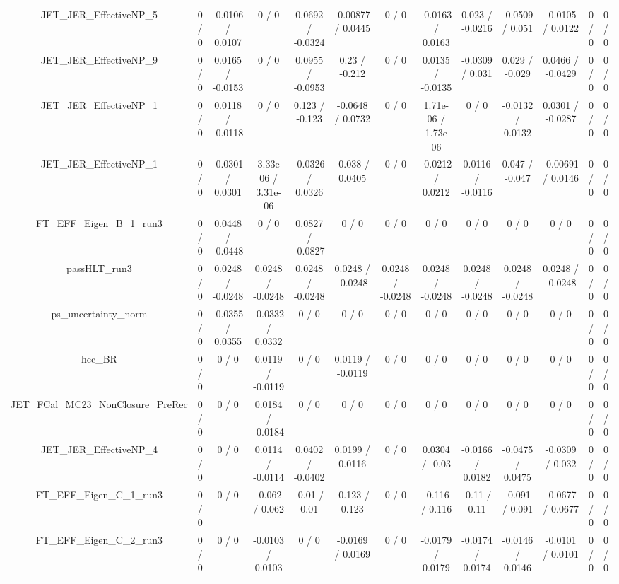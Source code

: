\documentclass[10pt]{article}
\begin{document}
\begin{table}[htbp]
\begin{center}
\begin{tabular}{|c|c|c|c|c|c|c|c|c|c|c|c|c|}
  JET_JER_EffectiveNP_5 & 0 / 0 & -0.0106 / 0.0107 & 0 / 0 & 0.0692 / -0.0324 & -0.00877 / 0.0445 & 0 / 0 & -0.0163 / 0.0163 & 0.023 / -0.0216 & -0.0509 / 0.051 & -0.0105 / 0.0122 & 0 / 0 & 0 / 0 \\ 
  JET_JER_EffectiveNP_9 & 0 / 0 & 0.0165 / -0.0153 & 0 / 0 & 0.0955 / -0.0953 & 0.23 / -0.212 & 0 / 0 & 0.0135 / -0.0135 & -0.0309 / 0.031 & 0.029 / -0.029 & 0.0466 / -0.0429 & 0 / 0 & 0 / 0 \\ 
  JET_JER_EffectiveNP_1 & 0 / 0 & 0.0118 / -0.0118 & 0 / 0 & 0.123 / -0.123 & -0.0648 / 0.0732 & 0 / 0 & 1.71e-06 / -1.73e-06 & 0 / 0 & -0.0132 / 0.0132 & 0.0301 / -0.0287 & 0 / 0 & 0 / 0 \\ 
  JET_JER_EffectiveNP_1 & 0 / 0 & -0.0301 / 0.0301 & -3.33e-06 / 3.31e-06 & -0.0326 / 0.0326 & -0.038 / 0.0405 & 0 / 0 & -0.0212 / 0.0212 & 0.0116 / -0.0116 & 0.047 / -0.047 & -0.00691 / 0.0146 & 0 / 0 & 0 / 0 \\ 
  FT_EFF_Eigen_B_1_run3 & 0 / 0 & 0.0448 / -0.0448 & 0 / 0 & 0.0827 / -0.0827 & 0 / 0 & 0 / 0 & 0 / 0 & 0 / 0 & 0 / 0 & 0 / 0 & 0 / 0 & 0 / 0 \\ 
  passHLT_run3 & 0 / 0 & 0.0248 / -0.0248 & 0.0248 / -0.0248 & 0.0248 / -0.0248 & 0.0248 / -0.0248 & 0.0248 / -0.0248 & 0.0248 / -0.0248 & 0.0248 / -0.0248 & 0.0248 / -0.0248 & 0.0248 / -0.0248 & 0 / 0 & 0 / 0 \\ 
  ps_uncertainty_norm & 0 / 0 & -0.0355 / 0.0355 & -0.0332 / 0.0332 & 0 / 0 & 0 / 0 & 0 / 0 & 0 / 0 & 0 / 0 & 0 / 0 & 0 / 0 & 0 / 0 & 0 / 0 \\ 
  hcc_BR & 0 / 0 & 0 / 0 & 0.0119 / -0.0119 & 0 / 0 & 0.0119 / -0.0119 & 0 / 0 & 0 / 0 & 0 / 0 & 0 / 0 & 0 / 0 & 0 / 0 & 0 / 0 \\ 
  JET_FCal_MC23_NonClosure_PreRec & 0 / 0 & 0 / 0 & 0.0184 / -0.0184 & 0 / 0 & 0 / 0 & 0 / 0 & 0 / 0 & 0 / 0 & 0 / 0 & 0 / 0 & 0 / 0 & 0 / 0 \\ 
  JET_JER_EffectiveNP_4 & 0 / 0 & 0 / 0 & 0.0114 / -0.0114 & 0.0402 / -0.0402 & 0.0199 / 0.0116 & 0 / 0 & 0.0304 / -0.03 & -0.0166 / 0.0182 & -0.0475 / 0.0475 & -0.0309 / 0.032 & 0 / 0 & 0 / 0 \\ 
  FT_EFF_Eigen_C_1_run3 & 0 / 0 & 0 / 0 & -0.062 / 0.062 & -0.01 / 0.01 & -0.123 / 0.123 & 0 / 0 & -0.116 / 0.116 & -0.11 / 0.11 & -0.091 / 0.091 & -0.0677 / 0.0677 & 0 / 0 & 0 / 0 \\ 
  FT_EFF_Eigen_C_2_run3 & 0 / 0 & 0 / 0 & -0.0103 / 0.0103 & 0 / 0 & -0.0169 / 0.0169 & 0 / 0 & -0.0179 / 0.0179 & -0.0174 / 0.0174 & -0.0146 / 0.0146 & -0.0101 / 0.0101 & 0 / 0 & 0 / 0 \\ 

\end{tabular}
\end{center}
\end{table}
\end{document}
